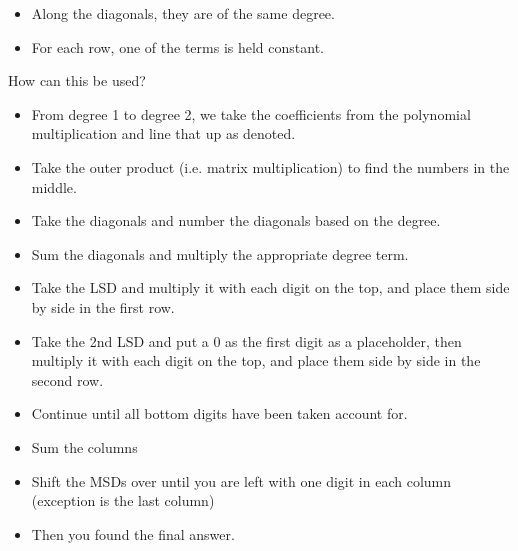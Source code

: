 \begin{example}
    \begin{itemize}
        \item Along the diagonals, they are of the same degree. 
        \item For each row, one of the terms is held constant. 
    \end{itemize}
    \vspace{1em}

    How can this be used?


    \begin{itemize}
        \item From degree 1 to degree 2, we take the coefficients from the polynomial multiplication and line that up as denoted. 
        \item Take the outer product (i.e. matrix multiplication) to find the numbers in the middle. 
        \item Take the diagonals and number the diagonals based on the degree.
        \item Sum the diagonals and multiply the appropriate degree term.
    \end{itemize}
\end{example}

\begin{example}
    \begin{itemize}
        \item Take the LSD and multiply it with each digit on the top, and place them side by side in the first row. 
        \item Take the 2nd LSD and put a 0 as the first digit as a placeholder, then multiply it with each digit on the top, and place them side by side in the second row. 
        \item Continue until all bottom digits have been taken account for. 
        \item Sum the columns 
        \item Shift the MSDs over until you are left with one digit in each column (exception is the last column)
        \item Then you found the final answer. 
    \end{itemize}
\end{example}



